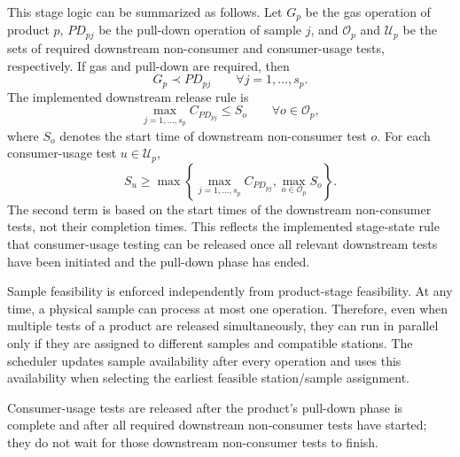 This stage logic can be summarized as follows. Let \(G_p\) be the gas operation
of product \(p\), \(PD_{pj}\) be the pull-down operation of sample \(j\), and
\(\mathcal{O}_p\) and \(\mathcal{U}_p\) be the sets of required downstream
non-consumer and consumer-usage tests, respectively. If gas and pull-down are
required, then
\[
G_p \prec PD_{pj} \qquad \forall j=1,\ldots,s_p.
\]
The implemented downstream release rule is
\[
\max_{j=1,\ldots,s_p} C_{PD_{pj}} \le S_o
\qquad \forall o\in\mathcal{O}_p,
\]
where \(S_o\) denotes the start time of downstream non-consumer test \(o\). For
each consumer-usage test \(u\in\mathcal{U}_p\),
\[
S_u \ge
\max\left\{
\max_{j=1,\ldots,s_p} C_{PD_{pj}},
\max_{o\in\mathcal{O}_p} S_o
\right\}.
\]
The second term is based on the start times of the downstream non-consumer
tests, not their completion times. This reflects the implemented stage-state
rule that consumer-usage testing can be released once all relevant downstream
tests have been initiated and the pull-down phase has ended.

Sample feasibility is enforced independently from product-stage feasibility.
At any time, a physical sample can process at most one operation. Therefore,
even when multiple tests of a product are released simultaneously, they can
run in parallel only if they are assigned to different samples and compatible
stations. The scheduler updates sample availability after every operation and
uses this availability when selecting the earliest feasible station/sample
assignment.


Consumer-usage tests are released after the product's pull-down phase is
complete and after all required downstream non-consumer tests have started;
they do not wait for those downstream non-consumer tests to finish.
